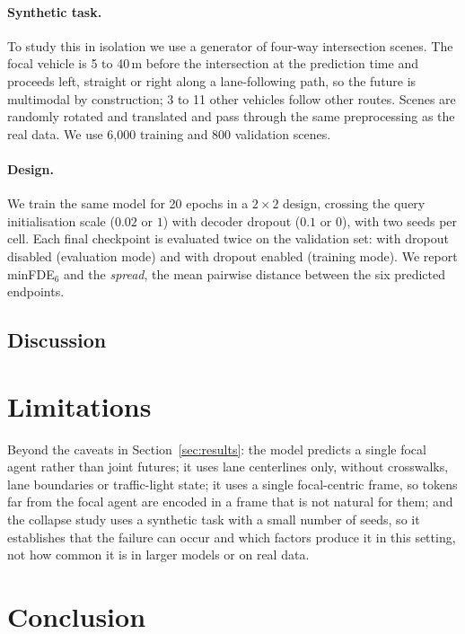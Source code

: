 \documentclass[10pt]{article}
\begin{document}
\paragraph{Synthetic task.} To study this in isolation we use a generator of four-way
intersection scenes. The focal vehicle is 5 to 40\,m before the intersection at the prediction
time and proceeds left, straight or right along a lane-following path, so the future is
multimodal by construction; 3 to 11 other vehicles follow other routes. Scenes are randomly
rotated and translated and pass through the same preprocessing as the real data. We use 6{,}000
training and 800 validation scenes.

\paragraph{Design.} We train the same model for 20 epochs in a $2\times2$ design, crossing the
query initialisation scale ($0.02$ or $1$) with decoder dropout ($0.1$ or $0$), with two seeds
per cell. Each final checkpoint is evaluated twice on the validation set: with dropout
disabled (evaluation mode) and with dropout enabled (training mode). We report minFDE$_6$ and
the \emph{spread}, the mean pairwise distance between the six predicted endpoints.



\subsection{Discussion}



\section{Limitations}

Beyond the caveats in Section~\ref{sec:results}: the model predicts a single focal agent
rather than joint futures; it uses lane centerlines only, without crosswalks, lane boundaries
or traffic-light state; it uses a single focal-centric frame, so tokens far from the focal
agent are encoded in a frame that is not natural for them; and the collapse study uses a
synthetic task with a small number of seeds, so it establishes that the failure can occur and
which factors produce it in this setting, not how common it is in larger models or on real
data.

\section{Conclusion}
\end{document}
